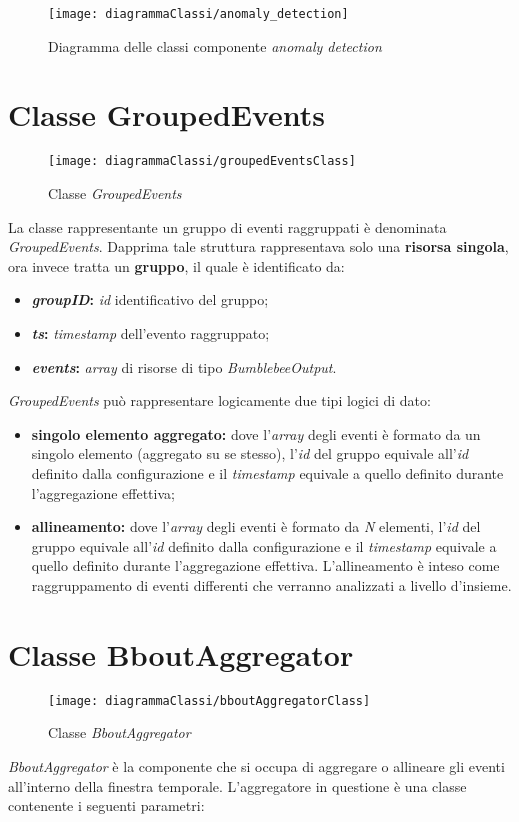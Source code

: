 \begin{figure}[H] 
    \centering 
    \texttt{[image: diagrammaClassi/anomaly\_detection]} 
    \caption{Diagramma delle classi componente \textit{anomaly detection}}
\end{figure}

\section{Classe GroupedEvents}\label{sec:ge}
\begin{figure}[H] 
    \centering 
    \texttt{[image: diagrammaClassi/groupedEventsClass]} 
    \caption{Classe \textit{GroupedEvents}}
\end{figure}
La classe rappresentante un gruppo di eventi raggruppati è denominata \textit{GroupedEvents}. Dapprima tale struttura rappresentava solo una \textbf{risorsa singola}, ora invece tratta un \textbf{gruppo}, il quale è identificato da:
\begin{itemize}
	\item{\textbf{\textit{groupID}:} \textit{id} identificativo del gruppo;}
	\item{\textbf{\textit{ts}:} \textit{\gls{timestamp}} dell'evento raggruppato;}
	\item{\textbf{\textit{events}:} \textit{array} di risorse di tipo \textit{BumblebeeOutput}.}
\end{itemize}
\textit{GroupedEvents} può rappresentare logicamente due tipi logici di dato:
\begin{itemize}
	\item{\textbf{singolo elemento aggregato:} dove l'\textit{array} degli eventi è formato da un singolo elemento (aggregato su se stesso), l'\textit{id} del gruppo equivale all'\textit{id} definito dalla configurazione e il \textit{\textit{\gls{timestamp}}} equivale a quello definito durante l'aggregazione effettiva;}
	\item{\textbf{allineamento:} dove l'\textit{array} degli eventi è formato da \textit{N} elementi, l'\textit{id} del gruppo equivale all'\textit{id} definito dalla configurazione e il \textit{\textit{\gls{timestamp}}} equivale a quello definito durante l'aggregazione effettiva. L'allineamento è inteso come raggruppamento di eventi differenti che verranno analizzati a livello d'insieme.}
\end{itemize}

\section{Classe BboutAggregator}\label{sec:aggregator}
\begin{figure}[H] 
    \centering 
    \texttt{[image: diagrammaClassi/bboutAggregatorClass]} 
    \caption{Classe \textit{BboutAggregator}}
\end{figure}
\textit{BboutAggregator} è la componente che si occupa di aggregare o allineare gli eventi all'interno della finestra temporale. L'aggregatore in questione è una classe contenente i seguenti parametri:


